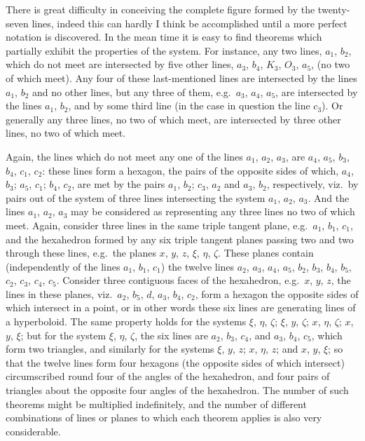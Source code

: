 \documentclass[11pt,a4paper]{book}
\begin{document}
\newpage

\setcounter{page}{453}

There is great difficulty in conceiving the complete figure formed by the twenty-seven lines, indeed this can hardly I think be accomplished until a more perfect notation is discovered. In the mean time it is easy to find theorems which partially exhibit the properties of the system. For instance, any two lines, $a_{1}$, $b_{2}$, which do not meet are intersected by five other lines, $a_{3}$, $b_{4}$, $K_{3}$, $O_{3}$, $a_{5}$, (no two of which meet). Any four of these last-mentioned lines are intersected by the lines $a_{1}$, $b_{2}$ and no other lines, but any three of them, e.g.\ $a_{3}$, $a_{4}$, $a_{5}$, are intersected by the lines $a_{1}$, $b_{2}$, and by some third line (in the case in question the line $c_{3}$). Or generally any three lines, no two of which meet, are intersected by three other lines, no two of which meet.

Again, the lines which do not meet any one of the lines $a_{1}$, $a_{2}$, $a_{3}$, are $a_{4}$, $a_{5}$, $b_{3}$, $b_{4}$, $c_{1}$, $c_{2}$: these lines form a hexagon, the pairs of the opposite sides of which, $a_{4}$, $b_{3}$; $a_{5}$, $c_{1}$; $b_{4}$, $c_{2}$, are met by the pairs $a_{1}$, $b_{2}$; $c_{3}$, $a_{2}$ and $a_{3}$, $b_{2}$, respectively, viz.\ by pairs out of the system of three lines intersecting the system $a_{1}$, $a_{2}$, $a_{3}$. And the lines $a_{1}$, $a_{2}$, $a_{3}$ may be considered as representing any three lines no two of which meet. Again, consider three lines in the same triple tangent plane, e.g.\ $a_{1}$, $b_{1}$, $c_{1}$, and the hexahedron formed by any six triple tangent planes passing two and two through these lines, e.g.\ the planes $x$, $y$, $z$, $\xi$, $\eta$, $\zeta$. These planes contain (independently of the lines $a_{1}$, $b_{1}$, $c_{1}$) the twelve lines $a_{2}$, $a_{3}$, $a_{4}$, $a_{5}$, $b_{2}$, $b_{3}$, $b_{4}$, $b_{5}$, $c_{2}$, $c_{3}$, $c_{4}$, $c_{5}$. Consider three contiguous faces of the hexahedron, e.g.\ $x$, $y$, $z$, the lines in these planes, viz.\ $a_{2}$, $b_{5}$, $d$, $a_{3}$, $b_{4}$, $c_{2}$, form a hexagon the opposite sides of which intersect in a point, or in other words these six lines are generating lines of a hyperboloid. The same property holds for the systems $\xi$, $\eta$, $\zeta$; $\xi$, $y$, $\zeta$; $x$, $\eta$, $\zeta$; $x$, $y$, $\xi$; but for the system $\xi$, $\eta$, $\zeta$, the six lines are $a_{2}$, $b_{3}$, $c_{4}$, and $a_{3}$, $b_{4}$, $c_{5}$, which form two triangles, and similarly for the systems $\xi$, $y$, $z$; $x$, $\eta$, $z$; and $x$, $y$, $\xi$; so that the twelve lines form four hexagons (the opposite sides of which intersect) circumscribed round four of the angles of the hexahedron, and four pairs of triangles about the opposite four angles of the hexahedron. The number of such theorems might be multiplied indefinitely, and the number of different combinations of lines or planes to which each theorem applies is also very considerable.
\end{document}
